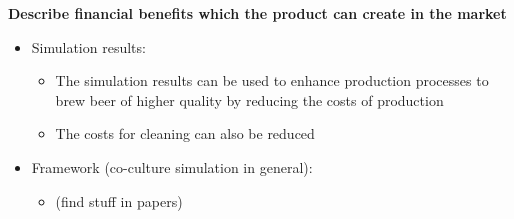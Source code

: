 
\noindent
\textbf{Describe financial benefits which the product can create in the market}

\begin{itemize}
 \item Simulation results:
 \begin{itemize}
  \item The simulation results can be used to enhance production processes to brew beer of higher quality by reducing the costs of production
  \item The costs for cleaning can also be reduced
 \end{itemize}

 \item Framework (co-culture simulation in general):
 \begin{itemize}
  \item (find stuff in papers)
 \end{itemize}

\end{itemize}
